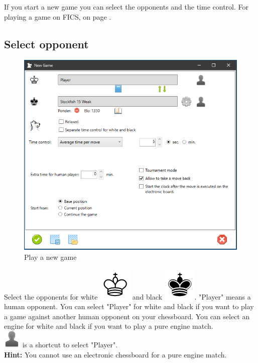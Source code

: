\documentclass[11pt,a4paper]{article}
\begin{document}
If you start a new game you can select the opponents and the time control. For playing a game on FICS,  on page \pageref{FICS}.  	

\subsection{Select opponent} \label{SelectOpponent}

\begin{figure}[H]
	\centering
	\includegraphics[scale=0.7]{NewGame2.png}
	\caption{Play a new game}
	\label{fig:NewGame2}
\end{figure}

Select the opponents for white \includegraphics[scale=0.4]{KingW.png} and black \includegraphics[scale=0.4]{KingB.png}. "Player" means a human opponent. You can select "Player" for white and black if you want to play a game against another human opponent on your chessboard. You can select an engine for white and black if you want to play a pure engine match.\\
\includegraphics[scale=0.4]{user_silhouette.png} is a shortcut to select "Player".\\
\textbf{Hint:} You cannot use an electronic chessboard for a pure engine match.\\
\end{document}
